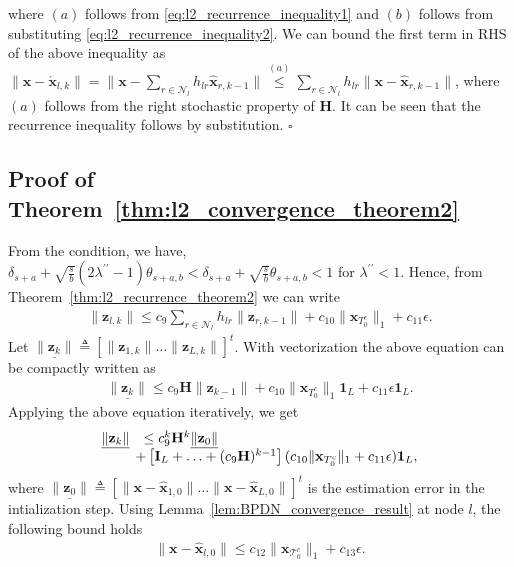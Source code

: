 \documentclass[journal]{IEEEtran}
\newcommand{\mbx}{\mathbf{x}}
\newcommand{\mbH}{\mathbf{H}}
\newcommand{\mbz}{\mathbf{z}}
\newcommand{\T}{\mathcal{T}}
\newcommand*{\QEDB}{\hfill\ensuremath{\square}}%
\begin{document}
where $(a)$ follows from \eqref{eq:l2_recurrence_inequality1} and $(b)$ follows from substituting \eqref{eq:l2_recurrence_inequality2}. We can bound the first term in RHS of the above inequality as $\|\mbx  - \acute{\mbx}_{l,k}\| = \|\mbx  - \sum\limits_{r \in \mathcal{N}_l} h_{lr} \hat{\mbx}_{r,k-1}\| \stackrel{(a)}{\leq}  \sum\limits_{r \in \mathcal{N}_l} h_{lr} \|\mbx  - \hat{\mbx}_{r,k-1}\|$, where $(a)$ follows from the right stochastic property of $\mbH$. It can be seen that the recurrence inequality follows by substitution. \QEDB

\subsection{Proof of Theorem~\ref{thm:l2_convergence_theorem2}}
From the condition, we have, $\delta_{s+a}+\sqrt{\frac{s}{b}} (2\lambda^{\prime \prime}  -1)\theta_{s+a,b} < \delta_{s+a}+\sqrt{\frac{s}{b}}\theta_{s+a,b} < 1$ for $\lambda^{\prime \prime} < 1$. Hence, from Theorem~\ref{thm:l2_recurrence_theorem2} we can write
\begin{eqnarray*}
\|\mbz_{l,k}\|\leq c_9 \sum\limits_{r \in \mathcal{N}_l} h_{lr} \|\mbz_{r,k-1}\|+ c_{10} \|\mbx_{T_0^c}\|_1 + c_{11} \epsilon.
\end{eqnarray*}
Let $\underline{\|\mbz_{k}\|} \triangleq \left[ \|\mbz_{1,k}\| \hdots \|\mbz_{L,k}\|\right]^{t}$. With vectorization the above equation can be compactly written as
\begin{eqnarray*}
\underline{\|\mbz_{k}\|}\leq c_9 \mbH \underline{\|\mbz_{k-1}\|} + c_{10} \|\mbx_{T_0^c}\|_1 \mathbf{1}_L + c_{11} \epsilon \mathbf{1}_L.
\end{eqnarray*}
Applying the above equation iteratively, we get
\begin{eqnarray}
\label{eq:l2_conv_thm_eq1}
\begin{array}{rl}
\underline{\|\mbz_{k}\|}& \leq c_9^k \mbH^k \underline{\|\mbz_{0}\|} \\ 
& \hspace{-2mm}+ \left[ \mathbf{I}_L + \hdots + (c_9 \mbH)^{k-1}\right](c_{10} \|\mbx_{T_0^c}\|_1 + c_{11} \epsilon )\mathbf{1}_L,
\end{array}
\end{eqnarray}
where $\underline{\|\mbz_{0}\|} \triangleq \left[ \|\mbx-\hat{\mbx}_{1,0}\| \hdots \|\mbx-\hat{\mbx}_{L,0}\|\right]^{t}$ is the estimation error in the intialization step. Using Lemma~\ref{lem:BPDN_convergence_result} at node $l$, the following bound holds
\begin{eqnarray*}
\|\mbx-\hat{\mbx}_{l,0}\| \leq c_{12} \|\mbx_{\T_0^c}\|_1 + c_{13} \epsilon.
\end{eqnarray*}
\end{document}

